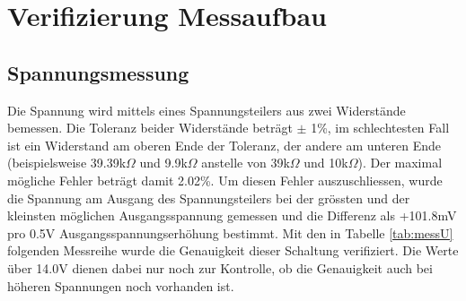 \section{Verifizierung Messaufbau}

\subsection{Spannungsmessung}
Die Spannung wird mittels eines Spannungsteilers aus zwei Widerstände bemessen. Die Toleranz beider Widerstände beträgt $\pm$ 1\%, im schlechtesten Fall ist ein Widerstand am oberen Ende der Toleranz, der andere am unteren Ende (beispielsweise 39.39k$\Omega$ und 9.9k$\Omega$ anstelle von 39k$\Omega$ und 10k$\Omega$). Der maximal mögliche Fehler beträgt damit 2.02\%. \newline
Um diesen Fehler auszuschliessen, wurde die Spannung am Ausgang des Spannungsteilers bei der grössten und der kleinsten möglichen Ausgangsspannung gemessen und die Differenz als +101.8mV pro 0.5V Ausgangsspannungserhöhung bestimmt. Mit den in Tabelle \ref{tab:messU} folgenden Messreihe wurde die Genauigkeit dieser Schaltung verifiziert. Die Werte über 14.0V dienen dabei nur noch zur Kontrolle, ob die Genauigkeit auch bei höheren Spannungen noch vorhanden ist.

